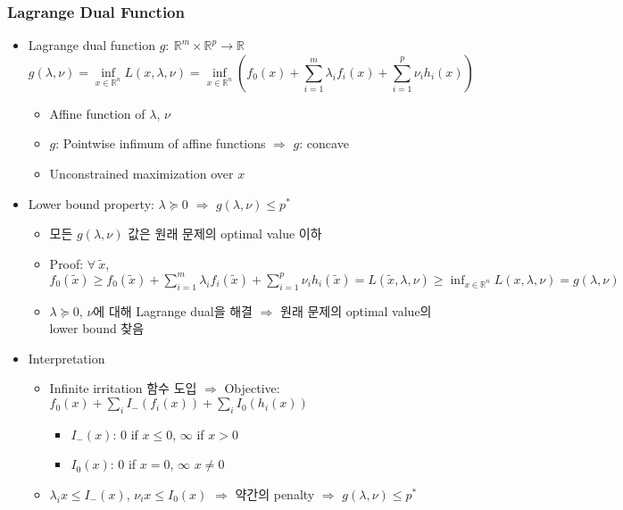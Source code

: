 \subsubsection*{Lagrange Dual Function}
\begin{itemize}
    \item Lagrange dual function $g:~\mathbb{R}^m\times\mathbb{R}^p\rightarrow\mathbb{R}$
    \begin{equation}
        g(\lambda,\nu) = \inf_{x\in\mathbb{R}^n}L(x,\lambda,\nu)= \inf_{x\in\mathbb{R}^n}\left(f_0(x) + \sum_{i=1}^m \lambda_i f_i(x) + \sum_{i=1}^p\nu_i h_i(x)\right)
    \end{equation}
    \begin{itemize}
        \item Affine function of $\lambda$, $\nu$
        \item $g$: Pointwise infimum of affine functions $\Rightarrow$ $g$: concave
        \item Unconstrained maximization over $x$
    \end{itemize}
    \item Lower bound property: $\lambda\succeq 0$ $\Rightarrow$ $g(\lambda,\nu)\leq p^{\ast}$
    \begin{itemize}
        \item 모든 $g(\lambda,\nu)$ 값은 원래 문제의 optimal value 이하
        \item Proof: $\forall~\tilde{x}$, $f_0(\tilde{x})\geq f_0(\tilde{x})+\sum_{i=1}^m\lambda_if_i(\tilde{x})+\sum_{i=1}^p\nu_ih_i(\tilde{x})=L(\tilde{x},\lambda,\nu)\geq\inf_{x\in\mathbb{R}^n}L(x,\lambda,\nu)=g(\lambda,\nu)$
        \item $\lambda\succeq 0$, $\nu$에 대해 Lagrange dual을 해결 $\Rightarrow$ 원래 문제의 optimal value의 lower bound 찾음
    \end{itemize}
    \item Interpretation
    \begin{itemize}
        \item Infinite irritation 함수 도입 $\Rightarrow$ Objective: $f_0(x)+\sum_iI_-(f_i(x))+\sum_iI_0(h_i(x))$
        \begin{itemize}
            \item $I_-(x)$: $0$ if $x\leq 0$, $\infty$ if $x>0$
            \item $I_0(x)$: $0$ if $x=0$, $\infty$ $x\neq 0$
        \end{itemize}
        \item $\lambda_ix\leq I_-(x)$, $\nu_ix\leq I_0(x)$ $\Rightarrow$ 약간의 penalty $\Rightarrow$ $g(\lambda,\nu)\leq p^{\ast}$
    \end{itemize}
    \begin{figures}
    \end{figures}
\end{itemize}

